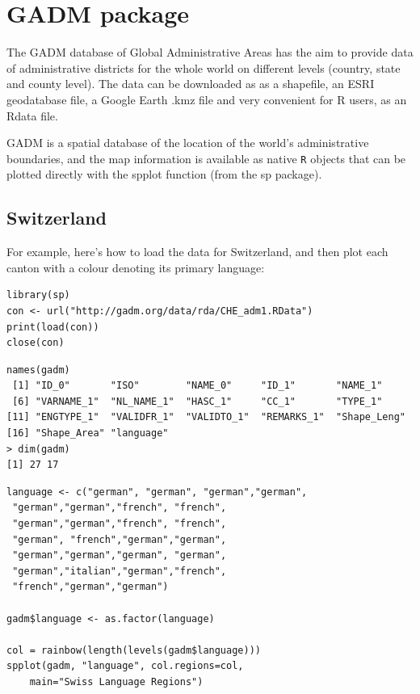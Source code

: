 \documentclass[]{article}
\begin{document}
\section*{GADM package}
The GADM database of Global Administrative Areas has the aim to provide data of administrative districts for the whole world on different levels (country, state and county level). The data can be downloaded as as a shapefile, an ESRI geodatabase file, a Google Earth .kmz file and very convenient for R users, as an Rdata file.


GADM is a spatial database of the location of the world's administrative boundaries, and the map information is available as native \texttt{R} objects that can be plotted directly with the spplot function (from the sp package). 

\subsection*{Switzerland}
For example, here's how to load the data for Switzerland, and then plot each canton with a colour denoting its primary language:

\begin{framed}
\begin{verbatim}
library(sp)
con <- url("http://gadm.org/data/rda/CHE_adm1.RData")
print(load(con))
close(con)
\end{verbatim}
\end{framed}

\begin{verbatim}
names(gadm)
 [1] "ID_0"       "ISO"        "NAME_0"     "ID_1"       "NAME_1"    
 [6] "VARNAME_1"  "NL_NAME_1"  "HASC_1"     "CC_1"       "TYPE_1"    
[11] "ENGTYPE_1"  "VALIDFR_1"  "VALIDTO_1"  "REMARKS_1"  "Shape_Leng"
[16] "Shape_Area" "language"  
> dim(gadm)
[1] 27 17
\end{verbatim}
\newpage
\begin{framed}
\begin{verbatim}
language <- c("german", "german", "german","german",
 "german","german","french", "french",
 "german","german","french", "french", 
 "german", "french","german","german",
 "german","german","german", "german",
 "german","italian","german","french",
 "french","german","german")
 
gadm$language <- as.factor(language)

col = rainbow(length(levels(gadm$language)))
spplot(gadm, "language", col.regions=col, 
    main="Swiss Language Regions")
\end{verbatim}
\end{framed}
\end{document}
